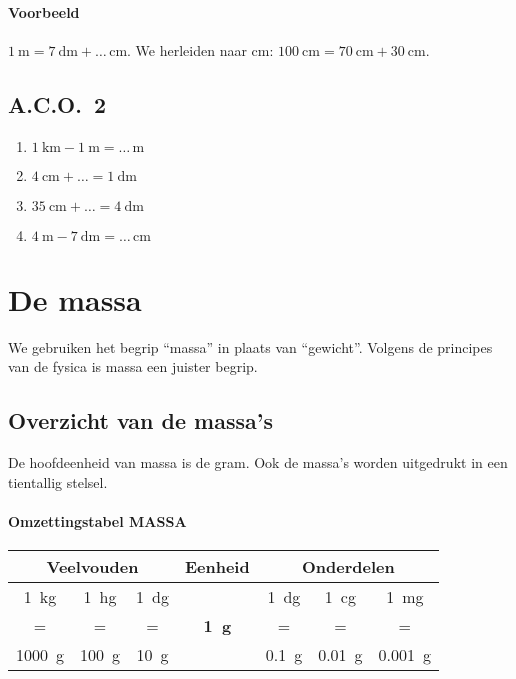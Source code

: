 \documentclass[a4paper,12pt]{article}
\begin{document}
\paragraph{Voorbeeld} \(\SI{1}{\metre}=\SI{7}{\deci\metre}+\ldots\,\si{\centi\metre}\). We herleiden naar \si{\centi\metre}: \(\SI{100}{\centi\metre}=\SI{70}{\centi\metre}+\SI{30}{\centi\metre}\).

\subsection*{A.C.O.~2}
\begin{enumerate}
  \item \(\SI{1}{\kilo\metre}-\SI{1}{\metre}=\ldots\,\si{\metre}\)
  \item \(\SI{4}{\centi\metre}+\ldots=\SI{1}{\deci\metre}\)
  \item \(\SI{35}{\centi\metre}+\ldots=\SI{4}{\deci\metre}\)
  \item \(\SI{4}{\metre}-\SI{7}{\deci\metre}=\ldots\,\si{\centi\metre}\)
\end{enumerate}

\section{De massa}
We gebruiken het begrip ``massa'' in plaats van ``gewicht''. Volgens de principes van de fysica is massa een juister begrip.

\subsection{Overzicht van de massa's}
De hoofdeenheid van massa is de gram. Ook de massa's worden uitgedrukt in een tientallig stelsel.

\paragraph{Omzettingstabel MASSA}
\renewcommand{\arraystretch}{1.2}
\begin{center}
\setlength{\fboxsep}{4pt}\setlength{\fboxrule}{0.5pt}%
\begin{tabular}{*{7}{c}}
  \multicolumn{3}{c}{\textbf{Veelvouden}} & \textbf{Eenheid} & \multicolumn{3}{c}{\textbf{Onderdelen}}\\
  \midrule
\SI{1}{\kilo\gram} & \SI{1}{\hecto\gram} & \SI{1}{\deca\gram} &  & \SI{1}{\deci\gram} & \SI{1}{\centi\gram} & \SI{1}{\milli\gram}\\
= & = & = & \textbf{\SI{1}{\gram}} & = & = & =\\
\SI{1000}{\gram} & \SI{100}{\gram} & \SI{10}{\gram} & & \SI{0.1}{\gram} & \SI{0.01}{\gram} & \SI{0.001}{\gram}
\end{tabular}%
\end{center}
\end{document}

